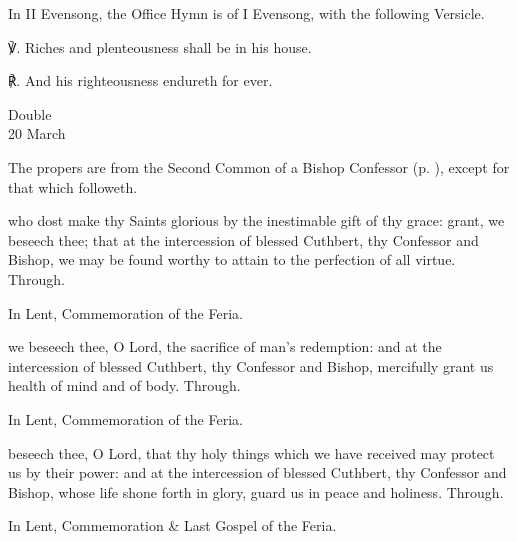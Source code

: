 \begin{rubric}
	In II Evensong, the Office Hymn is of I Evensong, with the following Versicle.
\end{rubric}

    ℣. Riches and plenteousness shall be in his house.

	℟. And his righteousness endureth for ever.


\begin{inhead}
    {Double\\
20 March}
\end{inhead}

\begin{rubric}
	The propers are from the Second Common of a Bishop Confessor (p. \pageref{CommonConfessorBishopII}), except for that which followeth.
\end{rubric}

\collect
{} who dost make thy Saints glorious by the inestimable gift of thy grace: grant, we beseech thee; that at the intercession of blessed Cuthbert, thy Confessor and Bishop, we may be found worthy to attain to the perfection of all virtue. Through.

\begin{rubric}
	In Lent, Commemoration of the Feria.
\end{rubric}

\secret
{} we beseech thee, O Lord, the sacrifice of man's redemption: and at the intercession of blessed Cuthbert, thy Confessor and Bishop, mercifully grant us health of mind and of body. Through.

\begin{rubric}
	In Lent, Commemoration of the Feria.
\end{rubric}

\postcommunion
{} beseech thee, O Lord, that thy holy things which we have received may protect us by their power: and at the intercession of blessed Cuthbert, thy Confessor and Bishop, whose life shone forth in glory, guard us in peace and holiness. Through.

\begin{rubric}
	In Lent, Commemoration \& Last Gospel of the Feria.
\end{rubric}



